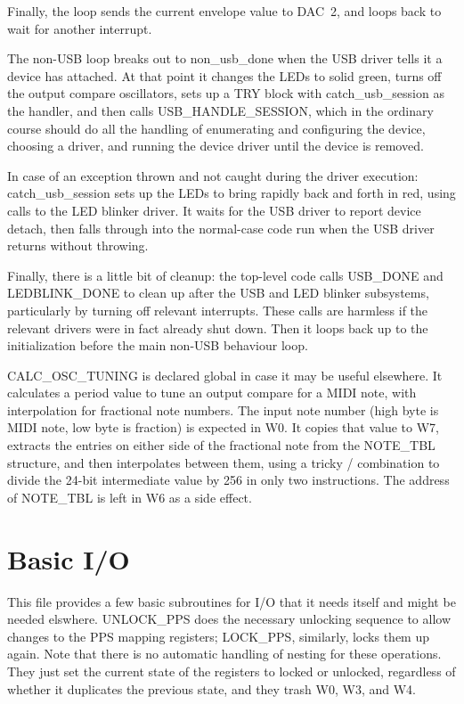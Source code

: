Finally, the loop sends the current envelope value to DAC~2, and loops back
to wait for another interrupt.

The non-USB loop breaks out to non\_usb\_done when the USB driver tells it a
device has attached.  At that point it changes the LEDs to solid green,
turns off the output compare oscillators, sets up a TRY block with
catch\_usb\_session as the handler, and then calls USB\_HANDLE\_SESSION,
which in the ordinary course should do all the handling of enumerating and
configuring the device, choosing a driver, and running the device driver
until the device is removed.

In case of an exception thrown and not caught during the driver execution:
catch\_usb\_session sets up the LEDs to bring rapidly back and forth in
red, using calls to the LED blinker driver.  It waits for the USB driver to
report device detach, then falls through into the normal-case code run when
the USB driver returns without throwing.

Finally, there is a little bit of cleanup:  the top-level code calls
USB\_DONE and LEDBLINK\_DONE to clean up after the USB and LED blinker
subsystems, particularly by turning off relevant interrupts.  These calls
are harmless if the relevant drivers were in fact already shut down.  Then
it loops back up to the initialization before the main non-USB behaviour
loop.

CALC\_OSC\_TUNING is declared global in case it may be useful elsewhere.  It
calculates a period value to tune an output compare for a MIDI note, with
interpolation for fractional note numbers.  The input note number (high byte
is MIDI note, low byte is fraction) is expected in W0.  It copies that value
to W7, extracts the entries on either side of the fractional note from the
NOTE\_TBL structure, and then interpolates between them, using a tricky
/ combination to divide the 24-bit intermediate value
by 256 in only two instructions.  The address of NOTE\_TBL is left in W6 as
a side effect.

\section{Basic I/O}

This file provides a few basic subroutines for I/O that it needs itself and
might be needed elswhere.  UNLOCK\_PPS does the necessary unlocking sequence
to allow changes to the PPS mapping registers; LOCK\_PPS, similarly, locks
them up again.  Note that there is no automatic handling of nesting for
these operations.  They just set the current state of the registers to
locked or unlocked, regardless of whether it duplicates the previous state,
and they trash W0, W3, and W4.

